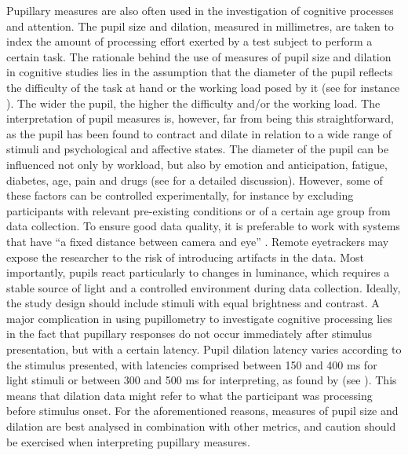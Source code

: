 Pupillary measures are also often used in the investigation of cognitive processes and attention. The pupil size and dilation, measured in millimetres, are taken to index the amount of processing effort exerted by a test subject to perform a certain task. The rationale behind the use of measures of pupil size and dilation in cognitive studies lies in the assumption that the diameter of the pupil reflects the difficulty of the task at hand or the working load posed by it (see for instance \citealt{hess_pupil_1964,just_intensity_1993,kahneman_pupil_1966}). The wider the pupil, the higher the difficulty and/or the working load. The interpretation of pupil measures is, however, far from being this straightforward, as the pupil has been found to contract and dilate in relation to a wide range of stimuli and psychological and affective states. The diameter of the pupil can be influenced not only by workload, but also by emotion and anticipation, fatigue, diabetes, age, pain and drugs (see \citealt[426]{holmqvist_eye_2011} for a detailed discussion). However, some of these factors can be controlled experimentally, for instance by excluding participants with relevant pre-existing conditions or of a certain age group from data collection. To ensure good data quality, it is preferable to work with systems that have ``a fixed distance between camera and eye'' \citep[530]{holmqvist_eye_2011}. Remote eyetrackers may expose the researcher to the risk of introducing artifacts in the data. Most importantly, pupils react particularly to changes in luminance, which requires a stable source of light and a controlled environment during data collection. Ideally, the study design should include stimuli with equal brightness and contrast. A major complication in using pupillometry to investigate cognitive processing lies in the fact that pupillary responses do not occur immediately after stimulus presentation, but with a certain latency. Pupil dilation latency varies according to the stimulus presented, with latencies comprised between 150 and 400 ms for light stimuli or between 300 and 500 ms for interpreting, as found by \citet[605]{hyona_pupil_1995} (see \citealt[215]{hvelplund_eye_2014}). This means that dilation data might refer to what the participant was processing before stimulus onset. For the aforementioned reasons, measures of pupil size and dilation are best analysed in combination with other metrics, and caution should be exercised when interpreting pupillary measures.

